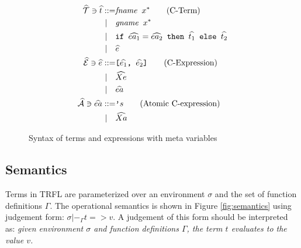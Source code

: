 \documentclass[10pt]{../sigplanconf}
\begin{document}
\begin{figure}\centering
  \begin{align*}
    \widehat{\mathcal{T}} \ni \widehat{t}
      ::=& \texttt{\textit{\rmfamily fname} $x^{*}$} \tag{C-Term} \\
    | \quad & \texttt{\textit{\rmfamily gname} $x^{*}$} \\
    | \quad & \texttt{if $\widehat{ea_1} = \widehat{ea_2}$ then $\widehat{t_1}$ else $\widehat{t_2}$} \\
    | \quad & \widehat{e} \\
    \widehat{\mathcal{E}} \ni \widehat{e} ::=& \texttt{[$\widehat{e_1}$, $\widehat{e_2}$]} \tag{C-Expression} \\
    | \quad & \widehat{Xe} \\
    | \quad & \widehat{ea} \\
    \widehat{\mathcal{A}} \ni \widehat{ea} ::= & \texttt{'}s \tag{Atomic C-expression} \\
    | \quad & \widehat{Xa}
  \end{align*}

\caption{Syntax of terms and expressions with meta variables}
\label{fig:cbnf}
\end{figure}


\subsection{Semantics}
Terms in TRFL are parameterized over an environment $\sigma$ and
the set of function definitions $\Gamma$. The operational semantics is
shown in Figure \ref{fig:semantics} using judgement form: $\sigma
|-_\Gamma t => v$. A judgement of this form should be interpreted as:
\textit{given environment $\sigma$ and function definitions $\Gamma$,
  the term $t$ evaluates to the value $v$.}
\end{document}
